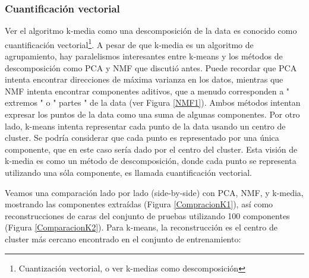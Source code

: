 \subsubsection{Cuantificación vectorial}

 Ver el algoritmo  k-media como una  descomposición de la data es conocido como cuantificación vectorial{\footnote{\scriptsize{Cuantización vectorial, o ver k-medias como descomposición}}}.   A pesar de que k-media es un algoritmo de agrupamiento, hay paralelismos interesantes entre k-means y los métodos de descomposición como PCA y NMF que discutió antes. Puede recordar que PCA intenta encontrar direcciones de máxima varianza en los datos, mientras que NMF intenta encontrar componentes aditivos, que a menudo corresponden a  "{ }extremos{ }"{}  o  "{ }partes{ }"  { }de la data (ver Figura \ref{NMF1}).    Ambos métodos intentan expresar los puntos de la data como una suma de algunas componentes. Por otro lado, k-means intenta representar cada punto de la data  usando un centro de cluster.     Se podría considerar  que cada punto es representado por  una única componente, que en este caso sería dado por el centro del cluster. Esta visión de k-media es como un método de descomposición, donde cada punto se representa utilizando una sóla componente, es llamada cuantificación vectorial.


Veamos una comparación lado por lado  (side-by-side)  con  PCA, NMF, y k-media, mostrando las 
componentes  extraídas (Figura \ref{CompracionK1}), así como reconstrucciones de caras del conjunto de pruebas utilizando 100 componentes (Figura \ref{ComparacionK2}). Para k-means, la reconstrucción es el centro de cluster más cercano encontrado en el conjunto de entrenamiento: \\

